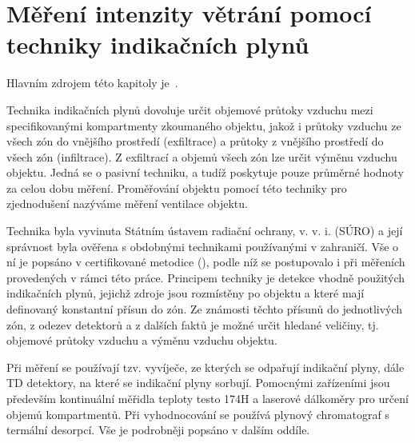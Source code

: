 \chapter{Měření intenzity větrání pomocí techniky indikačních plynů}\label{navesti:prutoky}
Hlavním zdrojem této kapitoly je~\cite{metodika}.

Technika indikačních plynů dovoluje určit objemové průtoky vzduchu mezi specifikovanými kompartmenty zkoumaného objektu, jakož i průtoky vzduchu ze všech zón do vnějšího prostředí (exfiltrace) a průtoky z vnějšího prostředí do všech zón (infiltrace). Z exfiltrací a objemů všech zón lze určit výměnu vzduchu objektu. Jedná se o pasivní techniku, a tudíž poskytuje pouze průměrné hodnoty za celou dobu měření. Proměřování objektu pomocí této techniky pro zjednodušení nazýváme měření ventilace objektu.

Technika byla vyvinuta Státním ústavem radiační ochrany, v. v. i. (SÚRO) a její správnost byla ověřena s obdobnými technikami používanými v zahraničí. Vše o ní je popsáno v certifikované metodice (\cite{metodika}), podle níž se postupovalo i při měřeních provedených v rámci této práce. Principem techniky je detekce vhodně použitých indikačních plynů, jejichž zdroje jsou rozmístěny po objektu a které mají definovaný konstantní přísun do zón. Ze známosti těchto přísunů do jednotlivých zón, z odezev detektorů a z dalších faktů je možné určit hledané veličiny, tj. objemové průtoky vzduchu a výměnu vzduchu objektu.

Při měření se používají tzv. vyvíječe, ze kterých se odpařují indikační plyny, dále TD detektory, na které se indikační plyny sorbují. Pomocnými zařízeními jsou především kontinuální měřidla teploty testo 174H a laserové dálkoměry pro určení objemů kompartmentů. Při vyhodnocování se používá plynový chromatograf s termální desorpcí. Vše je podrobněji popsáno v dalším oddíle.
